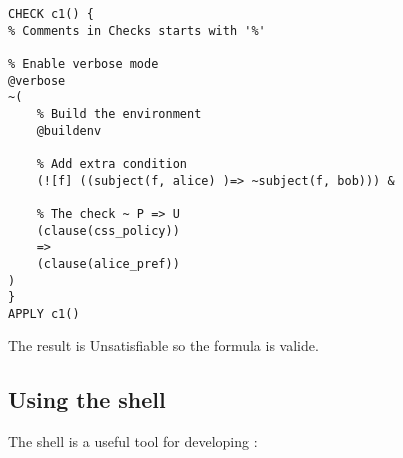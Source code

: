 \begin{lstlisting}
CHECK c1() {
% Comments in Checks starts with '%'

% Enable verbose mode
@verbose
~(
    % Build the environment
    @buildenv

    % Add extra condition
    (![f] ((subject(f, alice) )=> ~subject(f, bob))) &

    % The check ~ P => U
    (clause(css_policy))
    =>
    (clause(alice_pref))
)
}
APPLY c1()
\end{lstlisting}
The result is Unsatisfiable so the formula is valide.

\subsection{Using the shell}
The shell is a useful tool for developing :

